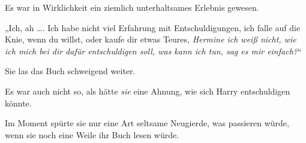 Es war in Wirklichkeit ein ziemlich unterhaltsames Erlebnis gewesen.

„Ich, ah …. Ich habe nicht viel Erfahrung mit Entschuldigungen, ich falle auf die Knie, wenn du willst, oder kaufe dir etwas Teures, \emph{Hermine ich weiß nicht, wie ich mich bei dir dafür entschuldigen soll, was kann ich tun, sag es mir einfach?}“

Sie las das Buch schweigend weiter.

Es war auch nicht so, als hätte \emph{sie} eine Ahnung, wie sich Harry entschuldigen könnte.

Im Moment spürte sie nur eine Art seltsame Neugierde, was passieren würde, wenn sie noch eine Weile ihr Buch lesen würde.

